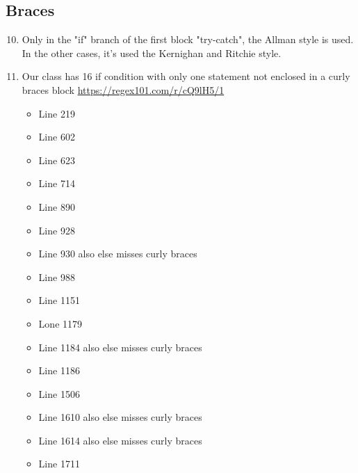 \subsection{Braces}
\begin{enumerate}
	\setcounter{enumi}{9}
	\item Only in the "if" branch of the first block "try-catch", the Allman style is used. In the other cases, it's used the Kernighan and Ritchie style.
	\item Our class has 16 if condition with only one statement not enclosed in a curly braces block \url{https://regex101.com/r/cQ9lH5/1}
	\begin{itemize}
		\item Line 219
		\item Line 602
		\item Line 623
		\item Line 714
		\item Line 890
		\item Line 928
		\item Line 930 also else misses curly braces
		\item Line 988
		\item Line 1151
		\item Lone 1179
		\item Line 1184 also else misses curly braces
		\item Line 1186
		\item Line 1506
		\item Line 1610 also else misses curly braces
		\item Line 1614 also else misses curly braces
		\item Line 1711
	\end{itemize}
\end{enumerate}

